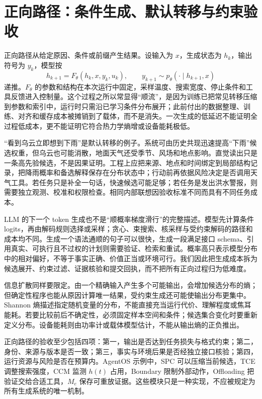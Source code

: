 \section{正向路径：条件生成、默认转移与约束验收}
\label{sec:forward_flow}

正向路径从给定原因、条件或前缀产生结果。设输入为 $x$，生成状态为 $h_k$，输出符号为 $y_k$，模型按
\[
h_{k+1}=F_\theta(h_k,x,y_k,u_k),\qquad
y_{k+1}\sim p_\theta(\cdot\mid h_{k+1},x)
\]
递推。$F_\theta$ 的参数和结构在本次运行中固定，采样温度、搜索宽度、停止条件和工具反馈进入控制量。这个过程之所以常显得“顺流”，是因为训练已把常见转移压缩到参数和索引中，运行时只需沿已学习条件分布展开；此前付出的数据整理、训练、对齐和缓存成本被摊销到了载体，而不是消失。一次生成的低延迟不能证明全过程低成本，更不能证明它符合热力学熵增或设备能耗极低。

“看到乌云立即想到下雨”是默认转移的例子。系统可由历史共现迅速提高“下雨”候选权重，但乌云也可能消散，地面天气还受季节、风场和地点影响。直觉读出只是一条高先验候选，不是因果证明。工程上应把来源、地点和时间绑定到局部结构记录，把降雨概率和备选解释保存在分布状态中；行动前再依据风险决定是否调用天气工具。若任务只是补全一句话，快速候选可能足够；若任务是发出洪水警报，则需要独立观测、校准和权限检查。相同内部联想因验收标准不同而具有不同任务成本。

LLM 的下一个 token 生成也不是“顺概率梯度滑行”的完整描述。模型先计算条件 logits，再由解码规则选择或采样；贪心、束搜索、核采样与受约束解码的路径和成本均不同。生成一个语法通顺的句子可以很快，生成一段满足接口 schema、引用真实、可执行且不过权的计划则需要验证、检索和重试。概率高只表示模型分布中的相对偏好，不等于事实正确、价值正当或环境可行。我们因此把生成成本拆为候选展开、约束过滤、证据核验和提交回执，而不把所有正向过程归为低难度。

信息扩散同样要限定。由一个精确输入产生多个可能输出，会增加候选分布的熵；但确定性程序也能从原因计算唯一结果，受约束生成还可能使输出分布更集中。Shannon 熵描述指定随机变量的分布，不能直接充当运行代价、理解程度或焦耳能耗。若要比较前后不确定性，必须固定样本空间和条件；候选集合变化时要重新定义分布。设备能耗则由功率计或载体模型估计，不能从输出熵的正负推出。

正向路径的验收至少包括四项：第一，输出是否达到任务损失与格式约束；第二，身份、来源与版本是否一致；第三，事实与环境后果是否经独立接口核验；第四，运行资源与风险是否在预算内。AgentOS 示例中，SPC 可以压缩当前候选，TCE 调整搜索强度，CCM 监测 $h(t)$ 占用，Boundary 限制外部动作，Offloading 把验证交给合适工具，$M_e$ 保存可重放证据。这些模块只是一种实现，不应被规定为所有生成系统的唯一机制。

